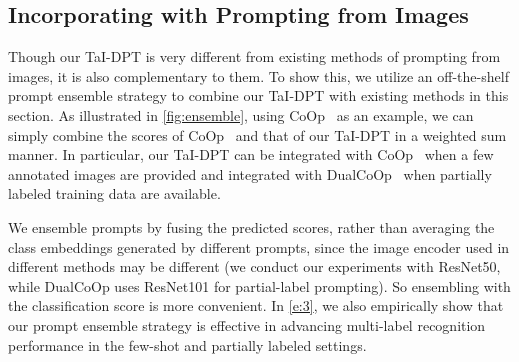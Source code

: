 \documentclass[10pt,twocolumn,letterpaper]{article}
\begin{document}
\subsection{Incorporating with Prompting from Images}
\label{methods4}
Though our TaI-DPT is very different from existing methods of prompting from images, it is also complementary to them. 
To show this, we utilize an off-the-shelf prompt ensemble strategy to combine our TaI-DPT with existing methods in this section.
As illustrated in \cref{fig:ensemble}, using CoOp~\cite{coop} as an example, we can simply combine the scores of CoOp~\cite{coop} and that of our TaI-DPT in a weighted sum manner. 
In particular, our TaI-DPT can be integrated with CoOp~\cite{coop} when a few annotated images are provided and integrated with DualCoOp~\cite{dualcoop} when partially labeled training data are available.

We ensemble prompts by fusing the predicted scores, rather than averaging the class embeddings generated by different prompts, since the image encoder used in different methods may be different (\eg we conduct our experiments with ResNet50, while DualCoOp uses ResNet101 for partial-label prompting). So ensembling with the classification score is more convenient.
In \cref{e:3}, we also empirically show that our prompt ensemble strategy is effective in advancing multi-label recognition performance in the few-shot and partially labeled settings.
\end{document}
